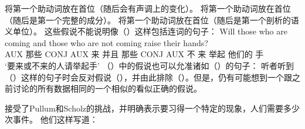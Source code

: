 \eal
\ex 将第一个助动词放在首位（随后会有声调上的变化）。
\ex 将第一个助动词放在首位（随后是第一个完整的成分）。
\ex 将第一个助动词放在首位（随后是第一个剖析的语义单位）。
\zl
这些假说不能说明像（）这样包括连词的句子：
\ea
\label{Beispiel-Hilfsverbvoranstellung-Koordination}
\gll Will those who are coming and those who are not coming raise their hands?\\
AUX 那些 CONJ AUX 来 并且 那些 CONJ AUX 不 来 举起 他们的 手\\
\glt `要来或不来的人请举起手'
\z
（）中的假说也可以允准诸如（）的句子：
\z
听者听到（）这样的句子时会反对假说（），并由此排除（）。但是，仍有可能想到一个跟之前讨论的所有数据相同的一个相似的看似正确的假说。

\citet{LY2002a}接受了Pullum和Scholz的挑战，并明确表示要习得一个特定的现象，人们需要多少次事件。
他们这样写道：

